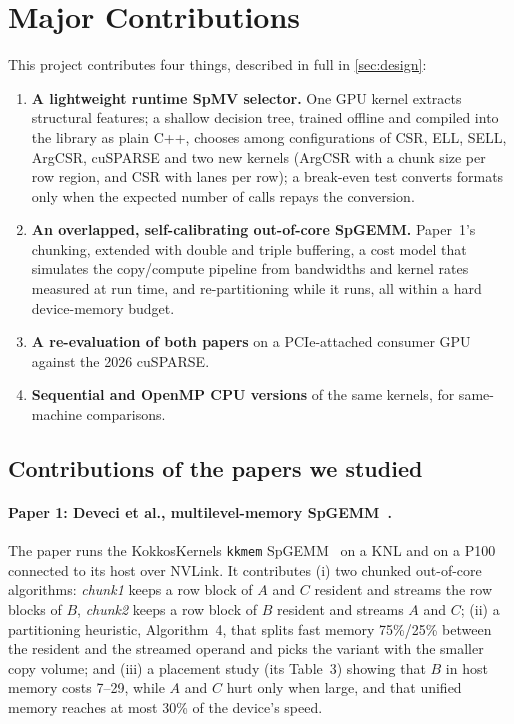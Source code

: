 \section{Major Contributions}\label{sec:contrib}

This project contributes four things, described in full in \cref{sec:design}:
\begin{enumerate}
\item \textbf{A lightweight runtime SpMV selector.} One GPU kernel extracts structural features; a shallow decision
  tree, trained offline and compiled into the library as plain C++, chooses among  configurations of
  CSR, ELL, SELL, ArgCSR, cuSPARSE and two new kernels (ArgCSR with a chunk size per row region, and CSR with lanes
  per row); a break-even test converts formats only when the expected number of calls repays the conversion.
\item \textbf{An overlapped, self-calibrating out-of-core SpGEMM.} Paper~1's chunking, extended with double and
  triple buffering, a cost model that simulates the copy/compute pipeline from bandwidths and kernel rates measured at
  run time, and re-partitioning while it runs, all within a hard device-memory budget.
\item \textbf{A re-evaluation of both papers} on a PCIe-attached consumer GPU against the 2026 cuSPARSE.
\item \textbf{Sequential and OpenMP CPU versions} of the same kernels, for same-machine comparisons.
\end{enumerate}

\subsection{Contributions of the papers we studied}\label{sec:papers}
\paragraph{Paper 1: Deveci et al., multilevel-memory SpGEMM~\cite{deveci2018multilevel}.} The paper runs the
KokkosKernels \texttt{kkmem} SpGEMM~\cite{deveci2018kkmem} on a KNL and on a P100 connected to its host over NVLink.
It contributes (i) two chunked out-of-core algorithms: \emph{chunk1} keeps a row block of $A$ and $C$ resident and
streams the row blocks of $B$, \emph{chunk2} keeps a row block of $B$ resident and streams $A$ and $C$; (ii) a
partitioning heuristic, Algorithm~4, that splits fast memory 75\%/25\% between the resident and the streamed operand
and picks the variant with the smaller copy volume; and (iii) a placement study (its Table~3) showing that $B$ in host
memory costs 7--29\x, while $A$ and $C$ hurt only when large, and that unified memory reaches at most 30\% of the
device's speed.

